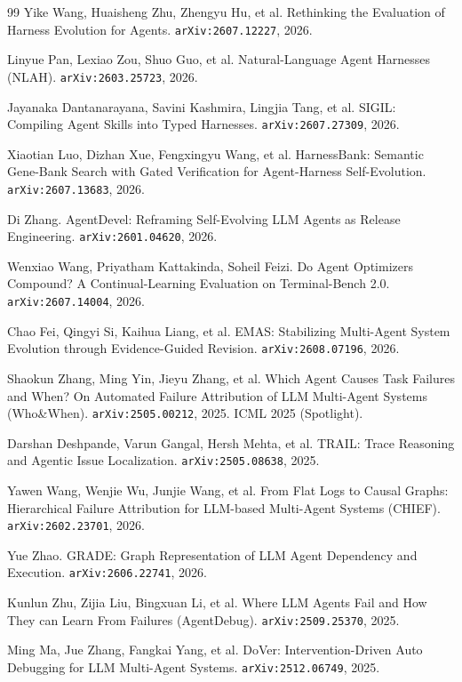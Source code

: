 \begin{thebibliography}{99}
 Yike Wang, Huaisheng Zhu, Zhengyu Hu, et
  al. Rethinking the Evaluation of Harness Evolution for Agents.
  \texttt{arXiv:2607.12227}, 2026.

 Linyue Pan, Lexiao Zou, Shuo Guo, et al. Natural-Language
  Agent Harnesses (NLAH). \texttt{arXiv:2603.25723}, 2026.

 Jayanaka Dantanarayana, Savini Kashmira, Lingjia Tang, et
  al. SIGIL: Compiling Agent Skills into Typed Harnesses.
  \texttt{arXiv:2607.27309}, 2026.

 Xiaotian Luo, Dizhan Xue, Fengxingyu Wang, et al.
  HarnessBank: Semantic Gene-Bank Search with Gated Verification for
  Agent-Harness Self-Evolution. \texttt{arXiv:2607.13683}, 2026.

 Di Zhang. AgentDevel: Reframing Self-Evolving LLM
  Agents as Release Engineering. \texttt{arXiv:2601.04620}, 2026.

 Wenxiao Wang, Priyatham Kattakinda, Soheil Feizi. Do
  Agent Optimizers Compound? A Continual-Learning Evaluation on
  Terminal-Bench 2.0. \texttt{arXiv:2607.14004}, 2026.

 Chao Fei, Qingyi Si, Kaihua Liang, et al. EMAS:
  Stabilizing Multi-Agent System Evolution through Evidence-Guided
  Revision. \texttt{arXiv:2608.07196}, 2026.

 Shaokun Zhang, Ming Yin, Jieyu Zhang, et al. Which
  Agent Causes Task Failures and When? On Automated Failure Attribution
  of LLM Multi-Agent Systems (Who\&When). \texttt{arXiv:2505.00212}, 2025.
  ICML 2025 (Spotlight).

 Darshan Deshpande, Varun Gangal, Hersh Mehta, et al.
  TRAIL: Trace Reasoning and Agentic Issue Localization.
  \texttt{arXiv:2505.08638}, 2025.

 Yawen Wang, Wenjie Wu, Junjie Wang, et al. From Flat Logs
  to Causal Graphs: Hierarchical Failure Attribution for LLM-based
  Multi-Agent Systems (CHIEF). \texttt{arXiv:2602.23701}, 2026.

 Yue Zhao. GRADE: Graph Representation of LLM Agent
  Dependency and Execution. \texttt{arXiv:2606.22741}, 2026.

 Kunlun Zhu, Zijia Liu, Bingxuan Li, et al. Where LLM
  Agents Fail and How They can Learn From Failures (AgentDebug).
  \texttt{arXiv:2509.25370}, 2025.

 Ming Ma, Jue Zhang, Fangkai Yang, et al. DoVer:
  Intervention-Driven Auto Debugging for LLM Multi-Agent Systems.
  \texttt{arXiv:2512.06749}, 2025.


\end{thebibliography}
